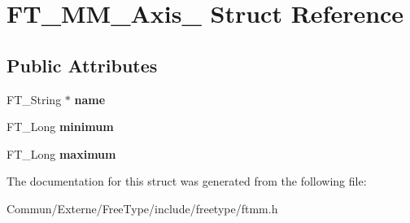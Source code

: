 \hypertarget{struct_f_t___m_m___axis__}{}\section{F\+T\+\_\+\+M\+M\+\_\+\+Axis\+\_\+ Struct Reference}
\label{struct_f_t___m_m___axis__}
\subsection*{Public Attributes}
\begin{DoxyCompactItemize}
\item 
F\+T\+\_\+\+String $\ast$ {\bfseries name}\hypertarget{struct_f_t___m_m___axis___a5c784efa44906c0e2b715eb1f866a09f}{}\label{struct_f_t___m_m___axis___a5c784efa44906c0e2b715eb1f866a09f}

\item 
F\+T\+\_\+\+Long {\bfseries minimum}\hypertarget{struct_f_t___m_m___axis___a9dc31f02b350b1356e0896673b5b73a4}{}\label{struct_f_t___m_m___axis___a9dc31f02b350b1356e0896673b5b73a4}

\item 
F\+T\+\_\+\+Long {\bfseries maximum}\hypertarget{struct_f_t___m_m___axis___addac1f8e71da1bedea9b393ae2751881}{}\label{struct_f_t___m_m___axis___addac1f8e71da1bedea9b393ae2751881}

\end{DoxyCompactItemize}


The documentation for this struct was generated from the following file\+:\begin{DoxyCompactItemize}
\item 
Commun/\+Externe/\+Free\+Type/include/freetype/ftmm.\+h\end{DoxyCompactItemize}
